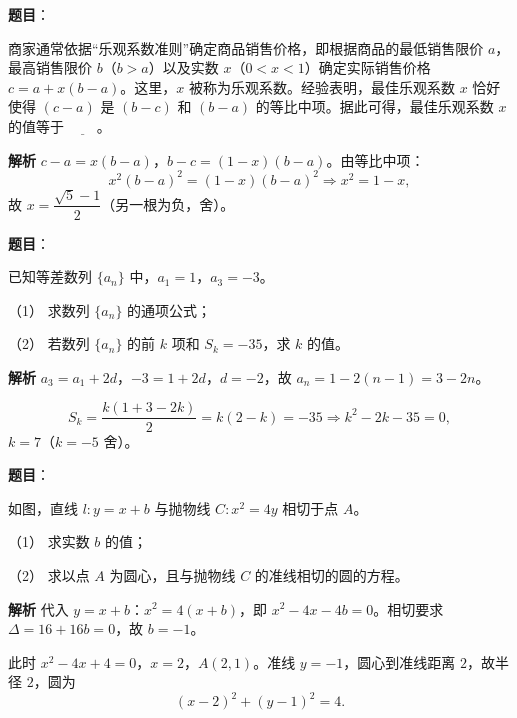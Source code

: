 \begin{answer}

\textbf{题目}：

商家通常依据“乐观系数准则”确定商品销售价格，即根据商品的最低销售限价 $a$，最高销售限价 $b$（$b>a$）以及实数 $x$（$0<x<1$）确定实际销售价格 $c=a+x(b-a)$。这里，$x$ 被称为乐观系数。经验表明，最佳乐观系数 $x$ 恰好使得 $(c-a)$ 是 $(b-c)$ 和 $(b-a)$ 的等比中项。据此可得，最佳乐观系数 $x$ 的值等于 $\underline{\qquad}$。

\textbf{解析}
$c-a=x(b-a)$，$b-c=(1-x)(b-a)$。由等比中项：
\nopagebreak[4]
\[x^2(b-a)^2=(1-x)(b-a)^2\Longrightarrow x^2=1-x,\]
故 $x=\dfrac{\sqrt5-1}2$（另一根为负，舍）。


\end{answer}
\begin{answer}

\textbf{题目}：

已知等差数列 $\{a_n\}$ 中，$a_1=1$，$a_3=-3$。

（1） 求数列 $\{a_n\}$ 的通项公式；

（2） 若数列 $\{a_n\}$ 的前 $k$ 项和 $S_k=-35$，求 $k$ 的值。

\textbf{解析}
$a_3=a_1+2d$，$-3=1+2d$，$d=-2$，故 $a_n=1-2(n-1)=3-2n$。

\nopagebreak[4]
\[S_k=\frac{k(1+3-2k)}2=k(2-k)=-35\Longrightarrow k^2-2k-35=0,\]
$k=7$（$k=-5$ 舍）。



\end{answer}
\begin{answer}

\textbf{题目}：

如图，直线 $l:y=x+b$ 与抛物线 $C:x^2=4y$ 相切于点 $A$。

（1） 求实数 $b$ 的值；

（2） 求以点 $A$ 为圆心，且与抛物线 $C$ 的准线相切的圆的方程。
\nopagebreak[4]
\begin{center}\end{center}
\nopagebreak[4]
\textbf{解析}
代入 $y=x+b$：$x^2=4(x+b)$，即 $x^2-4x-4b=0$。相切要求 $\Delta=16+16b=0$，故 $b=-1$。

此时 $x^2-4x+4=0$，$x=2$，$A(2,1)$。准线 $y=-1$，圆心到准线距离 $2$，故半径 $2$，圆为
\nopagebreak[4]
\[(x-2)^2+(y-1)^2=4.\]



\end{answer}
